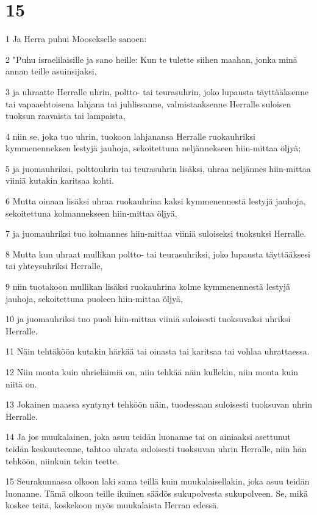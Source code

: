 \chapter{15}

\par 1 Ja Herra puhui Moosekselle sanoen:
\par 2 "Puhu israelilaisille ja sano heille: Kun te tulette siihen maahan, jonka minä annan teille asuinsijaksi,
\par 3 ja uhraatte Herralle uhrin, poltto- tai teurasuhrin, joko lupausta täyttääksenne tai vapaaehtoisena lahjana tai juhlissanne, valmistaaksenne Herralle suloisen tuoksun raavaista tai lampaista,
\par 4 niin se, joka tuo uhrin, tuokoon lahjanansa Herralle ruokauhriksi kymmenenneksen lestyjä jauhoja, sekoitettuna neljännekseen hiin-mittaa öljyä;
\par 5 ja juomauhriksi, polttouhrin tai teurasuhrin lisäksi, uhraa neljännes hiin-mittaa viiniä kutakin karitsaa kohti.
\par 6 Mutta oinaan lisäksi uhraa ruokauhrina kaksi kymmenennestä lestyjä jauhoja, sekoitettuna kolmannekseen hiin-mittaa öljyä,
\par 7 ja juomauhriksi tuo kolmannes hiin-mittaa viiniä suloiseksi tuoksuksi Herralle.
\par 8 Mutta kun uhraat mullikan poltto- tai teurasuhriksi, joko lupausta täyttääksesi tai yhteysuhriksi Herralle,
\par 9 niin tuotakoon mullikan lisäksi ruokauhrina kolme kymmenennestä lestyjä jauhoja, sekoitettuna puoleen hiin-mittaa öljyä,
\par 10 ja juomauhriksi tuo puoli hiin-mittaa viiniä suloisesti tuoksuvaksi uhriksi Herralle.
\par 11 Näin tehtäköön kutakin härkää tai oinasta tai karitsaa tai vohlaa uhrattaessa.
\par 12 Niin monta kuin uhrieläimiä on, niin tehkää näin kullekin, niin monta kuin niitä on.
\par 13 Jokainen maassa syntynyt tehköön näin, tuodessaan suloisesti tuoksuvan uhrin Herralle.
\par 14 Ja jos muukalainen, joka asuu teidän luonanne tai on ainiaaksi asettunut teidän keskuuteenne, tahtoo uhrata suloisesti tuoksuvan uhrin Herralle, niin hän tehköön, niinkuin tekin teette.
\par 15 Seurakunnassa olkoon laki sama teillä kuin muukalaisellakin, joka asuu teidän luonanne. Tämä olkoon teille ikuinen säädös sukupolvesta sukupolveen. Se, mikä koskee teitä, koskekoon myös muukalaista Herran edessä.
